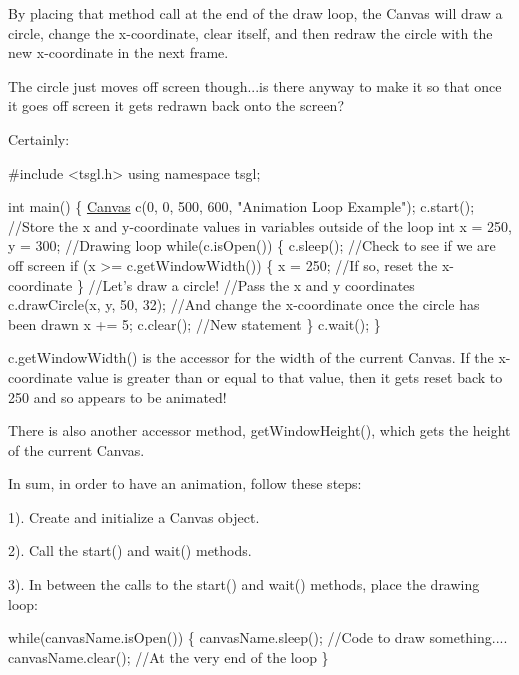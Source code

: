 By placing that method call at the end of the draw loop, the Canvas will draw a circle, change the x-\/coordinate, clear itself, and then redraw the circle with the new x-\/coordinate in the next frame.

The circle just moves off screen though...is there anyway to make it so that once it goes off screen it gets redrawn back onto the screen?

Certainly\-:


\begin{DoxyCode}
\textcolor{preprocessor}{#include <tsgl.h>}
\textcolor{keyword}{using namespace }tsgl;

\textcolor{keywordtype}{int} main() \{
  \hyperlink{classtsgl_1_1_canvas}{Canvas} c(0, 0, 500, 600, \textcolor{stringliteral}{"Animation Loop Example"});
  c.start();
  \textcolor{comment}{//Store the x and y-coordinate values in variables outside of the loop}
  \textcolor{keywordtype}{int} x = 250, y = 300;
  \textcolor{comment}{//Drawing loop}
  \textcolor{keywordflow}{while}(c.isOpen()) \{
    c.sleep();
    \textcolor{comment}{//Check to see if we are off screen}
    \textcolor{keywordflow}{if} (x >= c.getWindowWidth()) \{
       x = 250; \textcolor{comment}{//If so, reset the x-coordinate}
    \}
    \textcolor{comment}{//Let's draw a circle!}
    \textcolor{comment}{//Pass the x and y coordinates}
    c.drawCircle(x, y, 50, 32);
    \textcolor{comment}{//And change the x-coordinate once the circle has been drawn}
    x += 5;
    c.clear(); \textcolor{comment}{//New statement}
  \}
  c.wait();
\}
\end{DoxyCode}


{\ttfamily c.\-get\-Window\-Width()} is the accessor for the width of the current Canvas. If the x-\/coordinate value is greater than or equal to that value, then it gets reset back to 250 and so appears to be animated!

There is also another accessor method, {\ttfamily get\-Window\-Height()}, which gets the height of the current Canvas.

In sum, in order to have an animation, follow these steps\-:

1). Create and initialize a Canvas object.

2). Call the {\ttfamily start()} and {\ttfamily wait()} methods.

3). In between the calls to the {\ttfamily start()} and {\ttfamily wait()} methods, place the drawing loop\-:


\begin{DoxyCode}
\textcolor{keywordflow}{while}(canvasName.isOpen()) \{
  canvasName.sleep();
  \textcolor{comment}{//Code to draw something....}
  canvasName.clear(); \textcolor{comment}{//At the very end of the loop}
\}
\end{DoxyCode}


